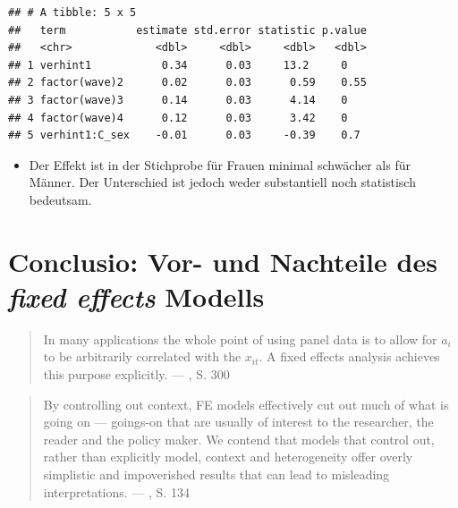 \documentclass[
]{book}
\providecommand{\tightlist}{%
  \setlength{\itemsep}{0pt}\setlength{\parskip}{0pt}}
\begin{document}
\begin{verbatim}
## # A tibble: 5 x 5
##   term           estimate std.error statistic p.value
##   <chr>             <dbl>     <dbl>     <dbl>   <dbl>
## 1 verhint1           0.34      0.03     13.2     0   
## 2 factor(wave)2      0.02      0.03      0.59    0.55
## 3 factor(wave)3      0.14      0.03      4.14    0   
## 4 factor(wave)4      0.12      0.03      3.42    0   
## 5 verhint1:C_sex    -0.01      0.03     -0.39    0.7
\end{verbatim}

\begin{itemize}
\tightlist
\item
  Der Effekt ist in der Stichprobe für Frauen minimal schwächer als für Männer. Der Unterschied ist jedoch weder substantiell noch statistisch bedeutsam.
\end{itemize}

\hypertarget{conclusio-vor--und-nachteile-des-fixed-effects-modells}{%
\section{\texorpdfstring{Conclusio: Vor- und Nachteile des \emph{fixed effects} Modells}{Conclusio: Vor- und Nachteile des fixed effects Modells}}\label{conclusio-vor--und-nachteile-des-fixed-effects-modells}}

\begin{quote}
In many applications the whole point of using panel data is to allow for \(a_i\) to be arbitrarily correlated with the \(x_{it}\). A fixed effects analysis achieves this purpose explicitly. --- \citet{wooldridge10}, S. 300
\end{quote}

\begin{quote}
By controlling out context, FE models effectively cut out much of what is going on --- goings-on that are usually of interest to the researcher, the reader and the policy maker. We contend that models that control out, rather than explicitly model, context and heterogeneity offer overly simplistic and impoverished results that can lead to misleading interpretations. --- \citet{bellExplainingFixedEffects2015}, S. 134
\end{quote}
\end{document}
